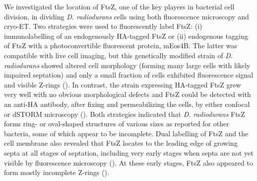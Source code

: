 We investigated the location of FtsZ, one of the key players in bacterial cell division, in dividing \textit{D. radiodurans} cells using both fluorescence microscopy and cryo-ET.
Two strategies were used to fluorescently label FtsZ: (i) immunolabelling of an endogenously HA-tagged FtsZ or (ii) endogenous tagging of FtsZ with a photoconvertible fluorescent protein, mEos4B.
The latter was compatible with live cell imaging, but this genetically modified strain of \textit{D. radiodurans} showed altered cell morphology (forming many large cells with likely impaired septation) and only a small fraction of cells exhibited fluorescence signal and visible Z-rings ().
In contrast, the strain expressing HA-tagged FtsZ grew very well with no obvious morphological defects and FtsZ could be detected with an anti-HA antibody, after fixing and permeabilizing the cells, by either confocal or dSTORM microscopy ().
Both strategies indicated that \textit{D. radiodurans} FtsZ forms ring- or oval-shaped structures of various sizes as reported for other bacteria, some of which appear to be incomplete.
Dual labelling of FtsZ and the cell membrane also revealed that FtsZ locates to the leading edge of growing septa at all stages of septation, including very early stages when septa are not yet visible by fluorescence microscopy ().
At these early stages, FtsZ also appeared to form mostly incomplete Z-rings ().

